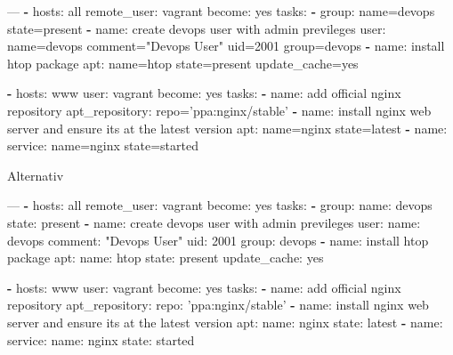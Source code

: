 \documentclass[11pt]{article}
\newenvironment{Shaded}{}{}
\newcommand{\KeywordTok}[1]{\textcolor[rgb]{0.00,0.44,0.13}{\textbf{{#1}}}}
\newcommand{\StringTok}[1]{\textcolor[rgb]{0.25,0.44,0.63}{{#1}}}
\newcommand{\OtherTok}[1]{\textcolor[rgb]{0.00,0.44,0.13}{{#1}}}
\newcommand{\FunctionTok}[1]{\textcolor[rgb]{0.02,0.16,0.49}{{#1}}}
\newcommand{\NormalTok}[1]{{#1}}
\begin{document}
\begin{Shaded}
\begin{Highlighting}[]
\OtherTok{---}
\KeywordTok{-} \FunctionTok{hosts:} \NormalTok{all}
  \FunctionTok{remote_user:} \NormalTok{vagrant}
  \FunctionTok{become:} \NormalTok{yes}
  \FunctionTok{tasks:}
  \KeywordTok{-} \FunctionTok{group:} \NormalTok{name=devops state=present}
  \KeywordTok{-} \FunctionTok{name:} \NormalTok{create devops user with admin previleges}
    \FunctionTok{user:} \NormalTok{name=devops comment="Devops User" uid=2001 group=devops}
  \KeywordTok{-} \FunctionTok{name:} \NormalTok{install htop package}
    \FunctionTok{apt:} \NormalTok{name=htop state=present update_cache=yes}

\KeywordTok{-} \FunctionTok{hosts:} \NormalTok{www}
  \FunctionTok{user:} \NormalTok{vagrant}
  \FunctionTok{become:} \NormalTok{yes}
  \FunctionTok{tasks:}
  \KeywordTok{-} \FunctionTok{name:} \NormalTok{add official nginx repository}
    \FunctionTok{apt_repository:} \NormalTok{repo='ppa:nginx/stable'}
  \KeywordTok{-} \FunctionTok{name:} \NormalTok{install nginx web server and ensure its at the latest version}
    \FunctionTok{apt:} \NormalTok{name=nginx state=latest}
  \KeywordTok{-} \FunctionTok{name:}
    \FunctionTok{service:} \NormalTok{name=nginx state=started}
\end{Highlighting}
\end{Shaded}

Alternativ

\begin{Shaded}
\begin{Highlighting}[]
\OtherTok{---}
\KeywordTok{-} \FunctionTok{hosts:} \NormalTok{all}
  \FunctionTok{remote_user:} \NormalTok{vagrant}
  \FunctionTok{become:} \NormalTok{yes}
  \FunctionTok{tasks:}
  \KeywordTok{-} \FunctionTok{group:}
      \FunctionTok{name:} \NormalTok{devops}
      \FunctionTok{state:} \NormalTok{present}
  \KeywordTok{-} \FunctionTok{name:} \NormalTok{create devops user with admin previleges}
    \FunctionTok{user:}
      \FunctionTok{name:} \NormalTok{devops}
      \FunctionTok{comment:} \StringTok{"Devops User"}
      \FunctionTok{uid:} \NormalTok{2001}
      \FunctionTok{group:} \NormalTok{devops}
  \KeywordTok{-} \FunctionTok{name:} \NormalTok{install htop package}
    \FunctionTok{apt:}
      \FunctionTok{name:} \NormalTok{htop}
      \FunctionTok{state:} \NormalTok{present}
      \FunctionTok{update_cache:} \NormalTok{yes}

\KeywordTok{-} \FunctionTok{hosts:} \NormalTok{www}
  \FunctionTok{user:} \NormalTok{vagrant}
  \FunctionTok{become:} \NormalTok{yes}
  \FunctionTok{tasks:}
  \KeywordTok{-} \FunctionTok{name:} \NormalTok{add official nginx repository}
    \FunctionTok{apt_repository:}
      \FunctionTok{repo:} \StringTok{'ppa:nginx/stable'}
  \KeywordTok{-} \FunctionTok{name:} \NormalTok{install nginx web server and ensure its at the latest version}
    \FunctionTok{apt:}
      \FunctionTok{name:} \NormalTok{nginx}
      \FunctionTok{state:} \NormalTok{latest}
  \KeywordTok{-} \FunctionTok{name:}
    \FunctionTok{service:}
      \FunctionTok{name:} \NormalTok{nginx}
      \FunctionTok{state:} \NormalTok{started}
\end{Highlighting}
\end{Shaded}
\end{document}
